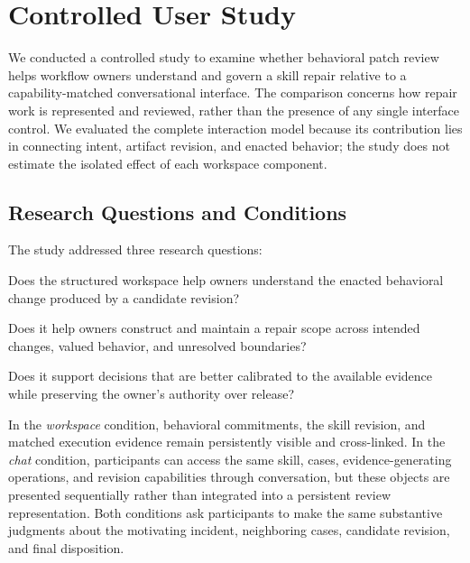 \section{Controlled User Study}
\label{sec:user-study}

We conducted a controlled study to examine whether behavioral patch review
helps workflow owners understand and govern a skill repair relative to a
capability-matched conversational interface. The comparison concerns how
repair work is represented and reviewed, rather than the presence of any
single interface control. We evaluated the complete interaction model because
its contribution lies in connecting intent, artifact revision, and enacted
behavior; the study does not estimate the isolated effect of each workspace
component.

\subsection{Research Questions and Conditions}

The study addressed three research questions:

\begin{description}[leftmargin=0pt,labelindent=0pt,style=nextline]
    \item[\textbf{RQ1: Behavioral understanding.}] Does the structured
    workspace help owners understand the enacted behavioral change produced by
    a candidate revision?
    \item[\textbf{RQ2: Repair scope.}] Does it help owners construct and
    maintain a repair scope across intended changes, valued behavior, and
    unresolved boundaries?
    \item[\textbf{RQ3: Release judgment.}] Does it support decisions that are
    better calibrated to the available evidence while preserving the owner's
    authority over release?
\end{description}

In the \emph{workspace} condition, behavioral commitments, the skill
revision, and matched execution evidence remain persistently visible and
cross-linked. In the \emph{chat} condition, participants can access the same
skill, cases, evidence-generating operations, and revision capabilities
through conversation, but these objects are presented sequentially rather
than integrated into a persistent review representation. Both conditions ask
participants to make the same substantive judgments about the motivating
incident, neighboring cases, candidate revision, and final disposition.


